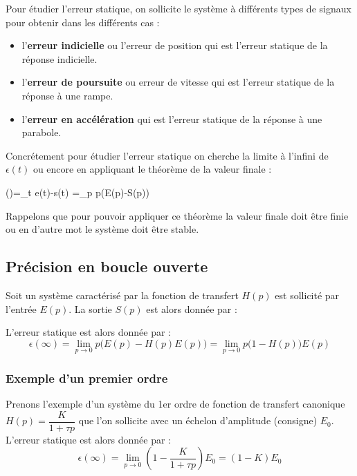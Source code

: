 Pour étudier l'erreur statique, on sollicite le système à différents 
types de signaux pour obtenir dans les différents cas :
\begin{itemize}
	\item l'\textbf{erreur indicielle} ou l'erreur de position qui est 
		  l'erreur statique de la réponse indicielle.
	\item l'\textbf{erreur de poursuite} ou erreur de vitesse qui est 
		  l'erreur statique de la réponse à une rampe.
	\item l'\textbf{erreur en accélération} qui est l'erreur statique 
		  de la réponse à une parabole.
\end{itemize}
Concrétement pour étudier l'erreur statique on cherche la limite à l'infini 
de $\epsilon(t)$ ou encore en appliquant le théorème de la valeur finale :
\begin{bequation}
\epsilon(\infty)=\lim\limits_{t\to\infty} e(t)-s(t)
	            =\lim\limits_{p} p\big(E(p)-S(p)\big)
\end{bequation}
Rappelons que pour pouvoir appliquer ce théorème la valeur finale doit 
être finie ou en d'autre mot le système doit être stable.
\subsection{Précision en boucle ouverte}
Soit un système caractérisé par la fonction de transfert $H(p)$ 
est sollicité par l'entrée $E(p)$. La sortie $S(p)$ est alors donnée par :
\begin{center}
    
\end{center}
L'erreur statique est alors donnée par :
$$
\epsilon(\infty)=\lim\limits_{p\to 0} p\big(E(p)-H(p)E(p)\big)
                =\lim\limits_{p\to 0} p\big(1-H(p)\big)E(p)
$$
\subsubsection{Exemple d'un premier ordre}
Prenons l'exemple d'un système du 1er ordre de fonction de transfert canonique 
$H(p)=\dfrac{K}{1+\tau p}$ que l'on sollicite avec un échelon 
d'amplitude (consigne) $E_0$.
L'erreur statique est alors donnée par :
$$
\epsilon(\infty)=\lim\limits_{p\to 0}\left(1-\dfrac{K}{1+\tau p}\right)E_0
                =(1-K)E_0
$$

